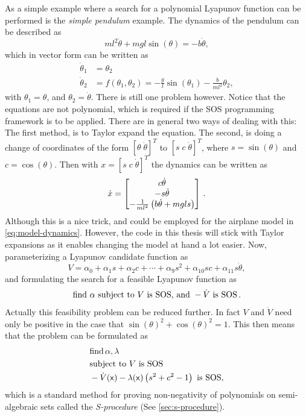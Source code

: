 As a simple example where a search for a polynomial Lyapunov function can be
performed is the \textit{simple pendulum} example. The dynamics of the pendulum
can be described as
\[
  ml^2\ddot{\theta} + mgl \sin{(\theta)} = -b\dot{\theta},
\]
which in vector form can be written as
\begin{align*}
  \dot{\theta}_1 &= \theta_2 \\
  \dot{\theta}_2 &= f(\theta_1,\theta_2) = -\frac{g}{l}\sin{(\theta_1)} -\frac{b}{ml^2}\theta_2,
\end{align*}
with \(\theta_1 = \theta\), and \(\theta_2 = \dot{\theta}\). There is still one
problem however. Notice that the equations are not polynomial, which is required
if the \ac{SOS} programming framework is to be applied. There are in general two
ways of dealing with this: The first method, is to Taylor expand the equation.
The second, is doing a change of coordinates of the form \(\left[ \theta \;
  \dot{\theta} \right]^{T} \) to \(\left[ s \;c \; \dot{\theta} \right]^{T}\),
where \(s = \sin{(\theta)}\) and \(c = \cos{(\theta)}\). Then with \(x = {\left[
    s \; c \; \dot{\theta} \right]}^{T}\) the dynamics can be written as
\[
  \dot{x} =
  \begin{bmatrix}
    c\dot{\theta} \\
    -s\dot{\theta} \\
    - \frac{1}{ml^2} \left( b\dot{\theta} + mgl s \right)
  \end{bmatrix} \, .
\]
Although this is a nice trick, and could be employed for the airplane model in
\cref{eq:model-dynamics}. However, the code in this thesis will stick with
Taylor expansions as it enables changing the model at hand a lot easier. Now,
parameterizing a Lyapunov candidate function as
\[
  V = \alpha_0 + \alpha_1s + \alpha_2c + \cdots + \alpha_9s^2 + \alpha_{10}sc +
  \alpha_{11}s\dot{\theta},
\]
and formulating the search for a feasible Lyapunov function as
\[
  \text{find } \alpha \text{ subject to } V \text{ is SOS, and } -\dot{V} \text{
    is SOS} \, .
\]
Actually this feasibility problem can be reduced further. In fact \(V\) and
\(\dot{V}\) need only be positive in the case that \(\sin{(\theta)}^2 +
\cos{(\theta)}^2 = 1\). This then means that the problem can be formulated as
\begin{align*}
  &\text{find}\,\alpha, \lambda \\
  &\text{subject to } V \text{ is SOS} \\
  &-\dot{V}({\mathbf{\mathsf{x}}}) - \lambda({\mathbf{\mathsf{x}}})\left( s^2 + c^2 -1 \right) \text{ is SOS},
\end{align*}
which is a standard method for proving non-negativity of polynomials on
semi-algebraic sets called the \textit{S-procedure} (See
\cref{sec:s-procedure}).

